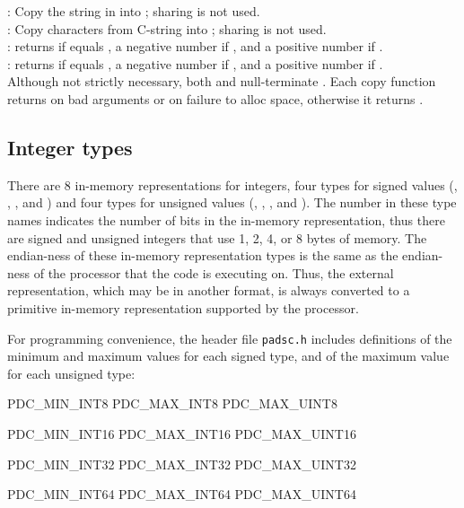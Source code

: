 : Copy the string in  into ; sharing is not used.\\[1ex]
: Copy  characters from C-string  into ; sharing is not used.\\[1ex]
: returns  if  equals , a negative number if ,
and a positive number if .\\[1ex]
: returns  if  equals , a negative number if ,
and a positive number if .\\[1ex]

Although not strictly necessary, both  and  null-terminate .
Each copy function returns  on bad arguments or on failure to alloc space, otherwise it returns .

\subsection{Integer types}

There are 8 in-memory representations for integers, four types for
signed values (, , , and )
and four types for unsigned values (, , , and ).
The number in these type names indicates the number of bits in the in-memory representation,
thus there are signed and unsigned integers that use 1, 2, 4, or 8 bytes of memory.
The endian-ness of these in-memory representation types is the same as the
endian-ness of the processor that the code is executing on.  Thus,
the external representation, which may be in another format, is always converted
to a primitive in-memory representation supported by the processor.

For programming convenience, the header file {\tt padsc.h} includes definitions of the minimum
and maximum values for each signed type, and of the maximum value for each unsigned type:
\begin{tinycode}
PDC_MIN_INT8
PDC_MAX_INT8
PDC_MAX_UINT8

PDC_MIN_INT16
PDC_MAX_INT16
PDC_MAX_UINT16

PDC_MIN_INT32
PDC_MAX_INT32
PDC_MAX_UINT32

PDC_MIN_INT64
PDC_MAX_INT64
PDC_MAX_UINT64
\end{tinycode}

